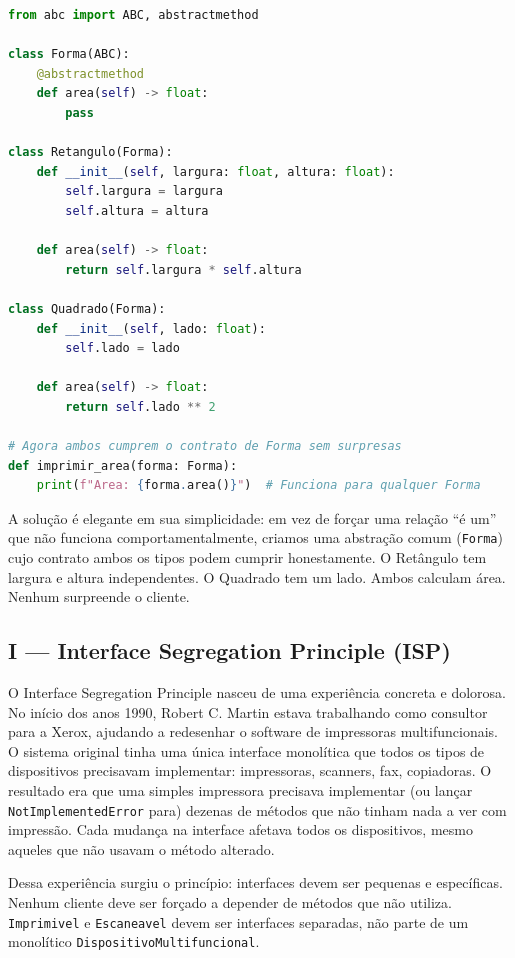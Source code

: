 \begin{lstlisting}[language=Python, caption={LSP aplicado: composição em vez de herança quebrada}]
from abc import ABC, abstractmethod

class Forma(ABC):
    @abstractmethod
    def area(self) -> float:
        pass

class Retangulo(Forma):
    def __init__(self, largura: float, altura: float):
        self.largura = largura
        self.altura = altura

    def area(self) -> float:
        return self.largura * self.altura

class Quadrado(Forma):
    def __init__(self, lado: float):
        self.lado = lado

    def area(self) -> float:
        return self.lado ** 2

# Agora ambos cumprem o contrato de Forma sem surpresas
def imprimir_area(forma: Forma):
    print(f"Area: {forma.area()}")  # Funciona para qualquer Forma
\end{lstlisting}

A solução é elegante em sua simplicidade: em vez de forçar uma relação ``é um''
que não funciona comportamentalmente, criamos uma abstração comum (\texttt{Forma})
cujo contrato ambos os tipos podem cumprir honestamente. O Retângulo tem largura
e altura independentes. O Quadrado tem um lado. Ambos calculam área. Nenhum
surpreende o cliente.


\subsection{I --- Interface Segregation Principle (ISP)}

O Interface Segregation Principle nasceu de uma experiência concreta e dolorosa.
No início dos anos 1990, Robert C. Martin estava trabalhando como consultor para
a Xerox, ajudando a redesenhar o software de impressoras multifuncionais. O
sistema original tinha uma única interface monolítica que todos os tipos de
dispositivos precisavam implementar: impressoras, scanners, fax, copiadoras.
O resultado era que uma simples impressora precisava implementar (ou lançar
\texttt{NotImplementedError} para) dezenas de métodos que não tinham nada a ver
com impressão. Cada mudança na interface afetava todos os dispositivos, mesmo
aqueles que não usavam o método alterado.

Dessa experiência surgiu o princípio: interfaces devem ser pequenas e específicas.
Nenhum cliente deve ser forçado a depender de métodos que não utiliza.
\texttt{Imprimivel} e \texttt{Escaneavel} devem ser interfaces separadas, não
parte de um monolítico \texttt{DispositivoMultifuncional}.

